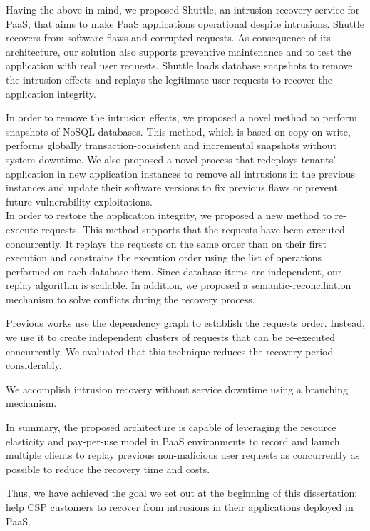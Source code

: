 Having the above in mind, we proposed Shuttle, an intrusion recovery service for \ac{PaaS}, that aims to make \ac{PaaS} applications operational despite intrusions. Shuttle recovers from software flaws and corrupted requests. As consequence of its architecture, our solution also supports preventive maintenance and to test the application with real user requests. Shuttle loads database snapshots to remove the intrusion effects and replays the legitimate user requests to recover the application integrity.

In order to remove the intrusion effects, we proposed a novel method to perform snapshots of \acs{NoSQL} databases. This method, which is based on copy-on-write, performs globally transaction-consistent and incremental snapshots without system downtime. We also proposed a novel process that redeploys tenants' application in new application instances to remove all intrusions in the previous instances and update their software versions to fix previous flaws or prevent future vulnerability exploitations.\\

In order to restore the application integrity, we proposed a new method to re-execute requests. This method supports that the requests have been executed concurrently. It replays the requests on the same order than on their first execution and constrains the execution order using the list of operations performed on each database item. Since database items are independent, our replay algorithm is scalable. In addition, we proposed a semantic-reconciliation mechanism to solve conflicts during the recovery process.

Previous works use the dependency graph to establish the requests order. Instead, we use it to create independent clusters of requests that can be re-executed concurrently. We evaluated that this technique reduces the recovery period considerably.

We accomplish intrusion recovery without service downtime using a branching mechanism.

In summary, the proposed architecture is capable of leveraging the resource elasticity and pay-per-use model in \ac{PaaS} environments to record and launch multiple clients to replay previous non-malicious user requests as concurrently as possible to reduce the recovery time and costs.

Thus, we have achieved the goal we set out at the beginning of this dissertation: help \acf{CSP} customers to recover from intrusions in their applications deployed in \acf{PaaS}.

